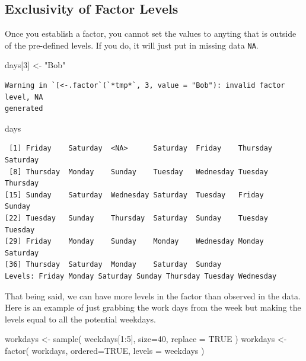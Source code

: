 \documentclass[
  letterpaper,
]{book}
\newenvironment{Shaded}{\begin{snugshade}}{\end{snugshade}}
\newcommand{\AttributeTok}[1]{\textcolor[rgb]{0.40,0.45,0.13}{#1}}
\newcommand{\ConstantTok}[1]{\textcolor[rgb]{0.56,0.35,0.01}{#1}}
\newcommand{\DecValTok}[1]{\textcolor[rgb]{0.68,0.00,0.00}{#1}}
\newcommand{\FunctionTok}[1]{\textcolor[rgb]{0.28,0.35,0.67}{#1}}
\newcommand{\NormalTok}[1]{\textcolor[rgb]{0.00,0.23,0.31}{#1}}
\newcommand{\OtherTok}[1]{\textcolor[rgb]{0.00,0.23,0.31}{#1}}
\newcommand{\SpecialCharTok}[1]{\textcolor[rgb]{0.37,0.37,0.37}{#1}}
\newcommand{\StringTok}[1]{\textcolor[rgb]{0.13,0.47,0.30}{#1}}
\begin{document}
\subsection{Exclusivity of Factor
Levels}\label{exclusivity-of-factor-levels}

Once you establish a factor, you cannot set the values to anyting that
is outside of the pre-defined levels. If you do, it will just put in
missing data \texttt{NA}.

\begin{Shaded}
\begin{Highlighting}[]
\NormalTok{days[}\DecValTok{3}\NormalTok{] }\OtherTok{\textless{}{-}} \StringTok{"Bob"}
\end{Highlighting}
\end{Shaded}

\begin{verbatim}
Warning in `[<-.factor`(`*tmp*`, 3, value = "Bob"): invalid factor level, NA
generated
\end{verbatim}

\begin{Shaded}
\begin{Highlighting}[]
\NormalTok{days}
\end{Highlighting}
\end{Shaded}

\begin{verbatim}
 [1] Friday    Saturday  <NA>      Saturday  Friday    Thursday  Saturday 
 [8] Thursday  Monday    Sunday    Tuesday   Wednesday Tuesday   Thursday 
[15] Sunday    Saturday  Wednesday Saturday  Tuesday   Friday    Sunday   
[22] Tuesday   Sunday    Thursday  Saturday  Sunday    Tuesday   Tuesday  
[29] Friday    Monday    Sunday    Monday    Wednesday Monday    Saturday 
[36] Thursday  Saturday  Monday    Saturday  Sunday   
Levels: Friday Monday Saturday Sunday Thursday Tuesday Wednesday
\end{verbatim}

That being said, we can have more levels in the factor than observed in
the data. Here is an example of just grabbing the work days from the
week but making the levels equal to all the potential weekdays.

\begin{Shaded}
\begin{Highlighting}[]
\NormalTok{workdays }\OtherTok{\textless{}{-}} \FunctionTok{sample}\NormalTok{( weekdays[}\DecValTok{1}\SpecialCharTok{:}\DecValTok{5}\NormalTok{], }\AttributeTok{size=}\DecValTok{40}\NormalTok{, }\AttributeTok{replace =} \ConstantTok{TRUE}\NormalTok{ )}
\NormalTok{workdays }\OtherTok{\textless{}{-}} \FunctionTok{factor}\NormalTok{( workdays, }\AttributeTok{ordered=}\ConstantTok{TRUE}\NormalTok{, }\AttributeTok{levels =}\NormalTok{ weekdays )}
\end{Highlighting}
\end{Shaded}
\end{document}
